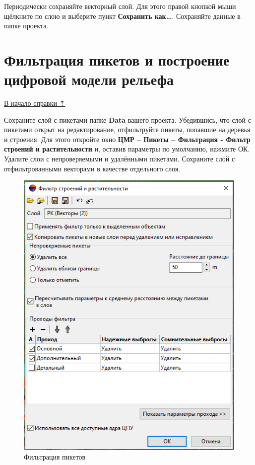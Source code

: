 \documentclass[
  12pt,
]{book}
\begin{document}
Периодически сохраняйте векторный слой. Для этого правой кнопкой мыши щёлкните по слою и выберите пункт \textbf{Сохранить как\ldots{}}. Сохраняйте данные в папке проекта.

\hypertarget{photomod_DEM-DEM}{%
\section{Фильтрация пикетов и построение цифровой модели рельефа}\label{photomod_DEM-DEM}}

\protect\hyperlink{photomod_DEM}{В начало справки ⇡}

Сохраните слой с пикетами папке \textbf{Data} вашего проекта. Убедившись, что слой с пикетами открыт на редактирование, отфильтруйте пикеты, попавшие на деревья и строения. Для этого откройте окно \textbf{ЦМР -- Пикеты -- Фильтрация - Фильтр строений и растительности} и, оставив параметры по умолчанию, нажмите ОК. Удалите слои с непроверяемыми и удалёнными пикетами. Сохраните слой с отфильтрованными векторами в качестве отдельного слоя.

\begin{figure}
\centering
\includegraphics{images/Ref16/Filtration.png}
\caption{Фильтрация пикетов}
\end{figure}
\end{document}
